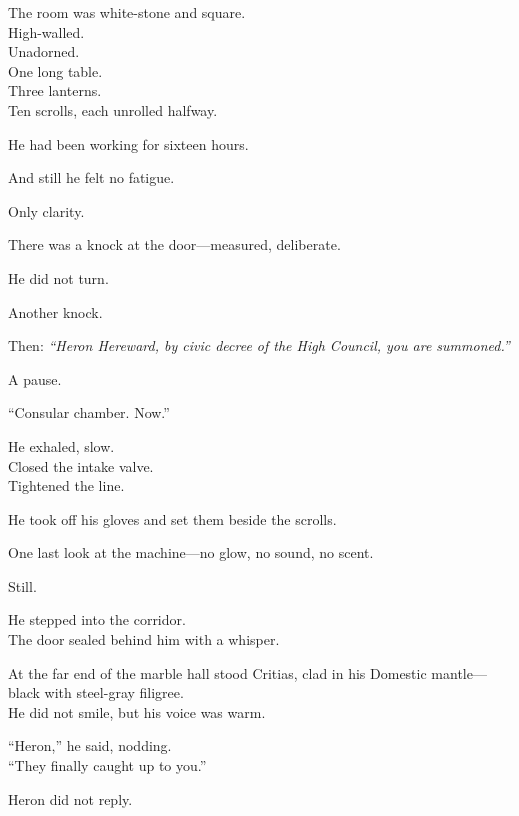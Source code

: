 \documentclass[12pt]{article}
\begin{document}
\vspace{1em}

The room was white-stone and square.\\
High-walled.\\
Unadorned.\\
One long table.\\
Three lanterns.\\
Ten scrolls, each unrolled halfway.

He had been working for sixteen hours.

And still he felt no fatigue.

Only clarity.

\vspace{1em}

There was a knock at the door—measured, deliberate.

He did not turn.

Another knock.

Then: \textit{“Heron Hereward, by civic decree of the High Council, you are summoned.”}

A pause.

“Consular chamber. Now.”

\vspace{1em}

He exhaled, slow.\\
Closed the intake valve.\\
Tightened the line.

He took off his gloves and set them beside the scrolls.

One last look at the machine—no glow, no sound, no scent.

Still.

\vspace{1em}

He stepped into the corridor.\\
The door sealed behind him with a whisper.

\vspace{1em}

\noindent At the far end of the marble hall stood Critias, clad in his Domestic mantle—black with steel-gray filigree.\\
He did not smile, but his voice was warm.

\vspace{1em}

“Heron,” he said, nodding.\\
“They finally caught up to you.”

Heron did not reply.
\end{document}
